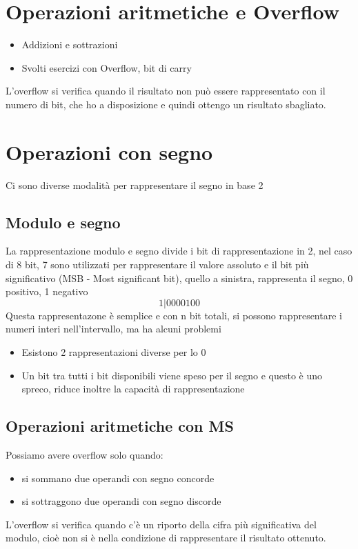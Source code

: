 \documentclass[12pt, a4paper, openany]{book}
\begin{document}
\section{Operazioni aritmetiche e Overflow}
\begin{itemize}
    \item Addizioni e sottrazioni
    \item Svolti esercizi con Overflow, bit di carry
\end{itemize}
 L'overflow si verifica quando il risultato non può essere rappresentato con il numero di bit,
 che ho a disposizione e quindi ottengo un risultato sbagliato.
\section{Operazioni con segno}
Ci sono diverse modalità per rappresentare il segno in base 2
\subsection{Modulo e segno}
La rappresentazione modulo e segno divide i bit di rappresentazione in 2, nel caso di 8 bit, 7 sono utilizzati per rappresentare il valore assoluto e il bit
più significativo (MSB - Most significant bit), quello a sinistra, rappresenta il segno, 0 positivo, 1 negativo
\begin{equation}
    1 | 0 0 0 0 1 0 0
\end{equation}
Questa rappresentazone è semplice e con n bit totali, si possono rappresentare i numeri interi nell'intervallo, ma ha alcuni problemi
\begin{itemize}
    \item Esistono 2 rappresentazioni diverse per lo 0
    \item Un bit tra tutti i bit disponibili viene speso per il segno e questo è uno spreco, riduce inoltre la capacità di rappresentazione
\end{itemize}

\subsection{Operazioni aritmetiche con MS}
Possiamo avere overflow solo quando:
\begin{itemize}
    \item si sommano due operandi con segno concorde
    \item si sottraggono due operandi con segno discorde
\end{itemize}
L'overflow si verifica quando c'è un riporto della cifra più significativa del modulo, cioè non si è nella
condizione di rappresentare il risultato ottenuto.
\end{document}
